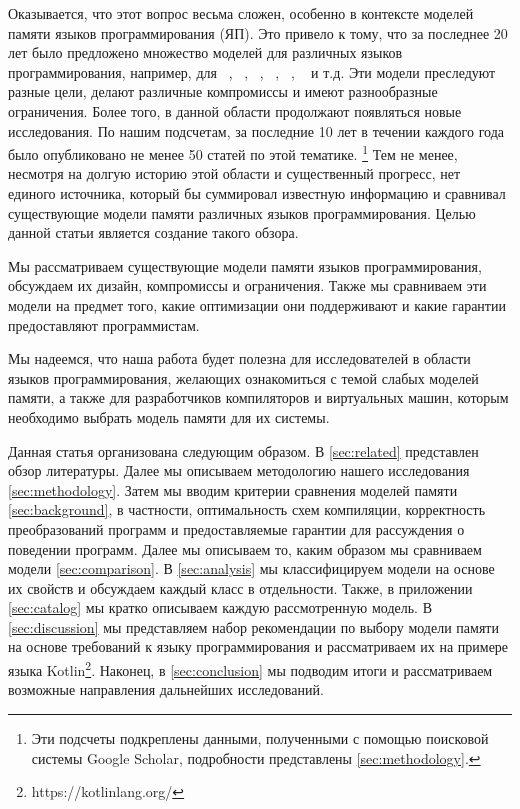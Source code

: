 Оказывается, что этот вопрос весьма сложен, 
особенно в контексте моделей памяти языков программирования (ЯП).
Это привело к тому, что за последнее 20 лет было предложено 
множество моделей для различных языков программирования, например, для 
\Java~\cite{Manson-al:POPL05, Bender-Palsberg:OOPSLA19}, \CPP~\cite{Batty-al:POPL11}, 
\LLVM~\cite{Chakraborty-Vafeiadis:CGO17}, \JS~\cite{Watt-al:PLDI2020}, 
\OCaml~\cite{Manson-al:POPL05}, \Haskell~\cite{Vollmer-al:PPoPP17} и т.д.
Эти модели преследуют разные цели, делают различные компромиссы
и имеют разнообразные ограничения.
Более того, в данной области продолжают появляться новые исследования. 
По нашим подсчетам, за последние 10 лет в течении 
каждого года было опубликовано не менее 50 статей по этой тематике.%
\footnote{Эти подсчеты подкреплены данными, полученными 
с помощью поисковой системы Google Scholar, 
подробности представлены \cref{sec:methodology}.}
Тем не менее, несмотря на долгую историю этой области и существенный прогресс,
нет единого источника, который бы суммировал 
известную информацию и сравнивал существующие 
модели памяти различных языков программирования. 
Целью данной статьи является создание такого обзора. 

Мы рассматриваем существующие модели памяти языков программирования, 
обсуждаем их дизайн, компромиссы и ограничения. 
Также мы сравниваем эти модели на предмет того,
какие оптимизации они поддерживают 
и какие гарантии предоставляют программистам. 

Мы надеемся, что наша работа будет полезна для 
исследователей в области языков программирования, 
желающих ознакомиться с темой слабых моделей памяти, 
а также для разработчиков компиляторов и виртуальных машин, 
которым необходимо выбрать модель памяти для их системы.

Данная статья организована следующим образом. 
В \cref{sec:related} представлен обзор литературы. 
Далее мы описываем методологию нашего исследования \cref{sec:methodology}.
Затем мы вводим критерии сравнения моделей памяти \cref{sec:background}, 
в частности, оптимальность схем компиляции, 
корректность преобразований программ
и предоставляемые гарантии для рассуждения 
о поведении программ.  
Далее мы описываем то, каким образом мы  
сравниваем  модели \cref{sec:comparison}. 
В \cref{sec:analysis} мы классифицируем модели на основе их свойств
и обсуждаем каждый класс в отдельности. 
Также, в приложении \ref{sec:catalog} мы кратко описываем каждую рассмотренную модель. 
В \cref{sec:discussion} мы представляем набор рекомендации 
по выбору модели памяти на основе требований к языку программирования 
и рассматриваем их на примере языка Kotlin\footnote{https://kotlinlang.org/}.
Наконец, в \cref{sec:conclusion} мы подводим итоги 
и рассматриваем возможные направления дальнейших исследований.
